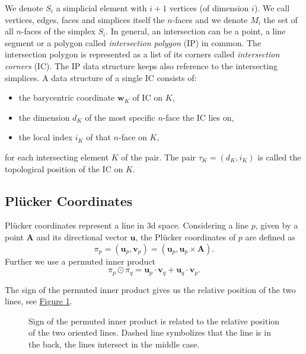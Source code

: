 \documentclass{elsarticle}
\newcommand{\fig}[1]{\hyperref[#1]{Figure \ref{#1}}}
\newcommand{\figpath}{figures/}
\def\vc#1{\mathbf{\boldsymbol{#1}}}     %
\newcommand{\plucker}{Pl\"{u}cker }
\newcommand{\nface}{$n$-face }
\newcommand{\nfaces}{$n$-faces }
\begin{document}
We denote $S_i$ a simplicial element with $i+1$ vertices (of dimension $i$). We call vertices, edges, faces and simplices itself the \nfaces and we denote
$M_i$ the set of all \nfaces of the simplex $S_i$.
In general, an intersection can be a point, a line segment or a polygon called \emph{intersection polygon} (IP) in common.
The intersection polygon is represented as a list of its corners called \emph{intersection corners} (IC). The IP data structure keeps also 
reference to the intersecting simplices. A data structure of a single IC consists of:
\begin{itemize}
 \item the barycentric coordinate $\vc w_K$ of IC on $K$,
 \item the dimension $d_K$ of the most specific \nface the IC lies on,
 \item the local index $i_K$ of that \nface on $K$,
\end{itemize}
for each intersecting element $K$ of the pair. The pair $\tau_K = (d_K, i_K)$
is called the topological position of the IC on $K$.


\subsection{\plucker Coordinates}
\plucker coordinates represent a line in 3d space.
Considering a line $p$, given by a point $\vc A$ and its directional vector $\vc{u}$, 
the \plucker coordinates of $p$ are defined as
\[ \pi_p = (\vc{u}_p, \vc{v}_p) = (\vc{u}_p, \vc{u}_p\times \vc A). \]
Further we use a permuted inner product
\[\pi_p \odot \pi_q = \vc{u}_p\cdot \vc{v}_q + \vc{u}_q \cdot \vc{v}_p. \]

The sign of the permuted inner product gives us the relative position of the two lines, 
see \fig{fig:plucker_products}.


\begin{figure}[!htb]
    \centering    
    \caption{Sign of the permuted inner product is related to the relative position of the two oriented lines.          
            Dashed line symbolizes that the line is in the back, the lines intersect in the middle case.
    }
    \label{fig:plucker_products}
\end{figure}
\end{document}
